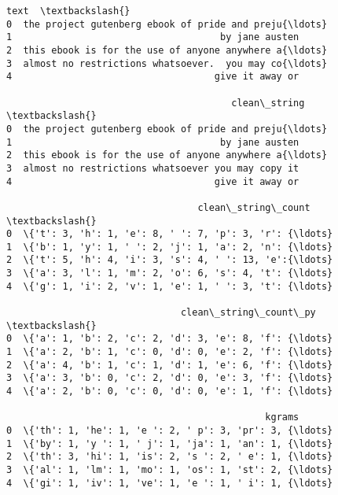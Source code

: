 \documentclass[11pt]{article}
\makeatletter
\newcommand{\boxspacing}{\kern\kvtcb@left@rule\kern\kvtcb@boxsep}
\newcommand{\prompt}[4]{
        \ttfamily\llap{{\color{#2}[#3]:\hspace{3pt}#4}}\vspace{-\baselineskip}
    }
\makeatother
\begin{document}
            \begin{tcolorbox}[breakable, size=fbox, boxrule=.5pt, pad at break*=1mm, opacityfill=0]
\prompt{Out}{outcolor}{8}{\boxspacing}
\begin{Verbatim}[commandchars=\\\{\}]
                                                text  \textbackslash{}
0  the project gutenberg ebook of pride and preju{\ldots}
1                                     by jane austen
2  this ebook is for the use of anyone anywhere a{\ldots}
3  almost no restrictions whatsoever.  you may co{\ldots}
4                                    give it away or

                                        clean\_string  \textbackslash{}
0  the project gutenberg ebook of pride and preju{\ldots}
1                                     by jane austen
2  this ebook is for the use of anyone anywhere a{\ldots}
3  almost no restrictions whatsoever you may copy it
4                                    give it away or

                                  clean\_string\_count  \textbackslash{}
0  \{'t': 3, 'h': 1, 'e': 8, ' ': 7, 'p': 3, 'r': {\ldots}
1  \{'b': 1, 'y': 1, ' ': 2, 'j': 1, 'a': 2, 'n': {\ldots}
2  \{'t': 5, 'h': 4, 'i': 3, 's': 4, ' ': 13, 'e':{\ldots}
3  \{'a': 3, 'l': 1, 'm': 2, 'o': 6, 's': 4, 't': {\ldots}
4  \{'g': 1, 'i': 2, 'v': 1, 'e': 1, ' ': 3, 't': {\ldots}

                               clean\_string\_count\_py  \textbackslash{}
0  \{'a': 1, 'b': 2, 'c': 2, 'd': 3, 'e': 8, 'f': {\ldots}
1  \{'a': 2, 'b': 1, 'c': 0, 'd': 0, 'e': 2, 'f': {\ldots}
2  \{'a': 4, 'b': 1, 'c': 1, 'd': 1, 'e': 6, 'f': {\ldots}
3  \{'a': 3, 'b': 0, 'c': 2, 'd': 0, 'e': 3, 'f': {\ldots}
4  \{'a': 2, 'b': 0, 'c': 0, 'd': 0, 'e': 1, 'f': {\ldots}

                                              kgrams
0  \{'th': 1, 'he': 1, 'e ': 2, ' p': 3, 'pr': 3, {\ldots}
1  \{'by': 1, 'y ': 1, ' j': 1, 'ja': 1, 'an': 1, {\ldots}
2  \{'th': 3, 'hi': 1, 'is': 2, 's ': 2, ' e': 1, {\ldots}
3  \{'al': 1, 'lm': 1, 'mo': 1, 'os': 1, 'st': 2, {\ldots}
4  \{'gi': 1, 'iv': 1, 've': 1, 'e ': 1, ' i': 1, {\ldots}
\end{Verbatim}
\end{tcolorbox}
        
\end{document}
